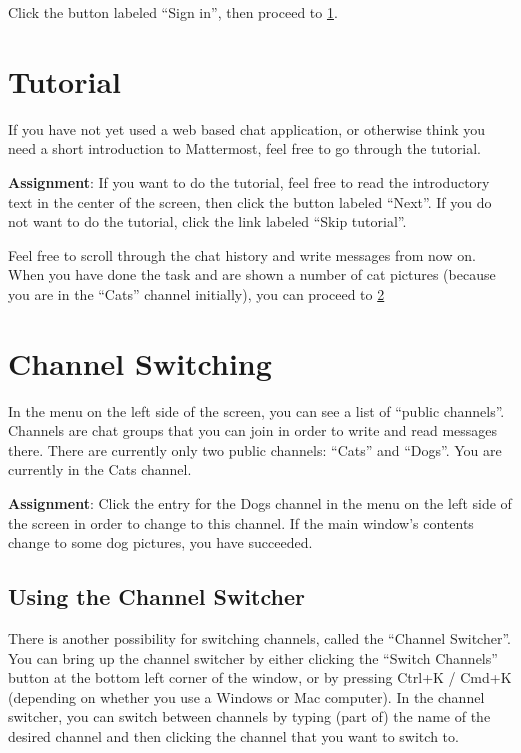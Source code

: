 \documentclass[paper=a4, fontsize=11pt]{scrartcl} %
\numberwithin{equation}{section} %
\numberwithin{figure}{section} %
\numberwithin{table}{section} %
\begin{document}
Click the button labeled ``Sign in'', then proceed to \ref{task1}.


\section{Tutorial}
\label{task1}

If you have not yet used a web based chat application, or otherwise think you need a short introduction to Mattermost, feel free to go through the tutorial.

\textbf{Assignment}: If you want to do the tutorial, feel free to read the introductory text in the center of the screen, then click the button labeled ``Next''.
If you do not want to do the tutorial, click the link labeled ``Skip tutorial''.

Feel free to scroll through the chat history and write messages from now on.
When you have done the task and are shown a number of cat pictures (because you are in the ``Cats'' channel initially), you can proceed to \ref{task2}


\section{Channel Switching}
\label{task2}

In the menu on the left side of the screen, you can see a list of ``public channels''.
Channels are chat groups that you can join in order to write and read messages there.
There are currently only two public channels: ``Cats'' and ``Dogs''.
You are currently in the Cats channel.

\textbf{Assignment}: Click the entry for the Dogs channel in the menu on the left side of the screen in order to change to this channel.
If the main window's contents change to some dog pictures, you have succeeded.

\subsection{Using the Channel Switcher}

There is another possibility for switching channels, called the ``Channel Switcher''.
You can bring up the channel switcher by either clicking the ``Switch Channels'' button at the bottom left corner of the window, or by pressing Ctrl+K / Cmd+K (depending on whether you use a Windows or Mac computer).
In the channel switcher, you can switch between channels by typing (part of) the name of the desired channel and then clicking the channel that you want to switch to.
\end{document}
